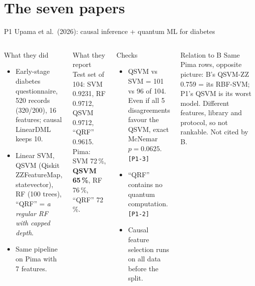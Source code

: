 \documentclass[aspectratio=169,10pt,t,xcolor={table}]{beamer}
\begin{document}
\section{The seven papers}
\begin{frame}{P1 \quad Upama et al.\ (2026): causal inference + quantum ML for diabetes}
\begin{columns}[T]
\begin{block}{What they did}
\footnotesize
\begin{itemize}
  \item Early-stage diabetes questionnaire, 520 records (320/200), 16 features; causal LinearDML keeps 10.
  \item Linear SVM, QSVM (Qiskit ZZFeatureMap, statevector), RF (100 trees), ``QRF'' = \emph{a regular RF with capped depth}.
  \item Same pipeline on Pima with 7 features.
\end{itemize}
\end{block}
\begin{block}{What they report}
\footnotesize
Test set of 104: SVM 0.9231, RF 0.9712, QSVM 0.9712, ``QRF'' 0.9615.\\
Pima: SVM 72\,\%, \textbf{QSVM 65\,\%}, RF 76\,\%, ``QRF'' 72\,\%.
\end{block}
\begin{alertblock}{Checks}
\footnotesize
\begin{itemize}
  \item QSVM vs SVM = 101 vs 96 of 104. Even if all 5 disagreements favour the QSVM, exact McNemar $p=0.0625$. \texttt{[P1-3]}
  \item ``QRF'' contains no quantum computation. \texttt{[P1-2]}
  \item Causal feature selection runs on all data before the split.
\end{itemize}
\end{alertblock}
\begin{exampleblock}{Relation to B}
\footnotesize
Same Pima rows, opposite picture: B's QSVM-ZZ 0.759 = its RBF-SVM; P1's QSVM is its worst model. Different features, library and protocol, so not rankable. Not cited by B.
\end{exampleblock}
\end{columns}
\end{frame}
\end{document}
